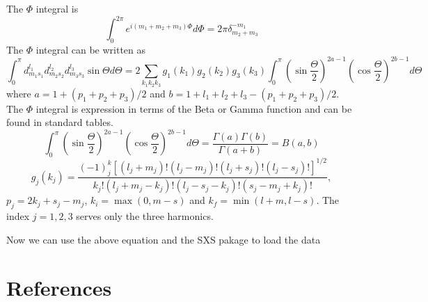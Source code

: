 \documentclass[prd,preprintnumbers,onecolumn,eqsecnum,floatfix,letter]{revtex4}
\begin{document}
The $\Phi$ integral is 
\begin{equation}
\int_{0}^{2\pi}e^{\mathit{i}(m_1+m_2+m_3)\Phi}d\Phi = 2\pi\delta^{-m_1}_{m_2+m_3}
\end{equation}
The $\Phi$ integral can be written as 
\begin{equation}
\int_{0}^{\pi}d^{l_1}_{m_1s_1}d^{l_2}_{m_2s_2}d^{l_3}_{m_3s_3}\sin\Theta d\Theta = 2\sum_{k_1k_2k_3}g_1(k_1)g_2(k_2)g_3(k_3)\int_{0}^{\pi}\left(\sin\frac{\Theta}{2}\right)^{2a-1}\left(\cos\frac{\Theta}{2}\right)^{2b-1}d\Theta
\end{equation}
where $a=1+(p_1+p_2+p_3)/2$ and $b=1+l_1+l_2+l_3-(p_1+p_2+p_3)/2$. The $\Phi$ integral is expression in terms of the Beta or Gamma function and can be found in standard tables.
\begin{equation}
\int_{0}^{\pi}\left(\sin\frac{\Theta}{2}\right)^{2a-1}\left(\cos\frac{\Theta}{2}\right)^{2b-1}d\Theta=\frac{\Gamma(a)\Gamma(b)}{\Gamma(a+b)}=B(a,b)
\end{equation}
\begin{equation}
g_j(k_j)=\frac{(-1)^k_j[(l_j + m_j)!(l_j-m_j)!(l_j+s_j)!(l_j-s_j)!]^{1/2}}{k_j!(l_j+m_j-k_j)!(l_j-s_j-k_j)!(s_j-m_j+k_j)!},
\end{equation}
$p_j=2k_j+s_j-m_j$, $k_i=\max(0, m-s)$ and $k_f=\min(l+m, l-s)$. The index $j=1,2,3$ serves only the three harmonics.

Now we can use the above equation and the SXS pakage to load the data
\section*{References}



\end{document}
